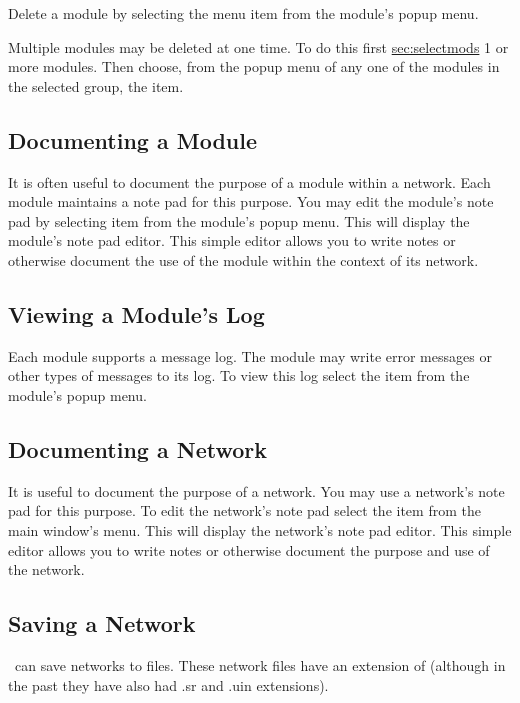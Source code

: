 Delete a module by selecting the  menu item from the
module's popup menu.

Multiple modules may be deleted at one time.  To do this first
\hyperref{select}{select (see Section~}{)}{sec:selectmods} 1 or more
modules. Then choose, from the popup menu of any one of the modules in the
selected group, the  item.


\subsection{Documenting a Module}
\label{sec:docmodule}

It is often useful to document the purpose of a module within a network.
Each module maintains a note pad for this purpose.  You may edit the
module's note pad by selecting  item from the module's
popup menu.  This will display the module's note pad editor.  This simple
editor allows you to write notes or otherwise document the use of the
module within the context of its network.

\subsection{Viewing a Module's Log}
\label{sec:viewmodslog}

Each module supports a message log.  The module may write error messages or
other types of messages to its log.  To view this log select the
 item from the module's popup menu.

\subsection{Documenting a Network}
\label{sec:docnetwork}

It is useful to document the purpose of a network.  You may use a network's
note pad for this purpose.  To edit the network's note pad select the
 item from the main window's  menu.  This
will display the network's note pad editor.  This simple editor allows you
to write notes or otherwise document the purpose and use of the network.


\subsection{Saving a Network}
\label{sec:savenet}

\sr\ can save networks to files.  These network files have an extension of
 (although in the past they have also had .sr and .uin
extensions).  

